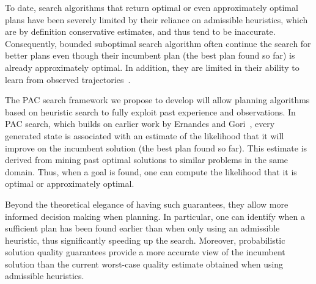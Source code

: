 \documentclass[12pt]{article}
\begin{document}


To date, search algorithms that return optimal or even approximately optimal plans have been severely limited by their reliance on admissible heuristics, which are by definition conservative estimates, and thus tend to be inaccurate. Consequently, bounded suboptimal search algorithm often continue the search for better plans even though their incumbent plan (the best plan found so far) is already approximately optimal. In addition, they are limited in their ability to learn from observed trajectories~\cite{thayer2011bounded,phillips2012graphs}.

The PAC search framework we propose to develop will allow planning algorithms based on heuristic search to fully exploit past experience and observations. In PAC search, which builds on earlier work by Ernandes and Gori~\cite{ernandes2004likely}, every generated state is associated with an estimate of the likelihood that it will improve on the incumbent solution (the best plan found so far). This estimate is derived from mining past optimal solutions to similar problems in the same domain. Thus, when a goal is found, one can compute the likelihood that it is optimal or approximately optimal. 


Beyond the theoretical elegance of having such guarantees, they allow more informed decision making when planning. In particular, one can identify when a sufficient plan has been found earlier than when only using an admissible heuristic, thus significantly speeding up the search. Moreover, probabilistic solution quality guarantees provide a more accurate view of the incumbent solution than the current worst-case quality estimate obtained when using admissible heuristics.  
\end{document}
